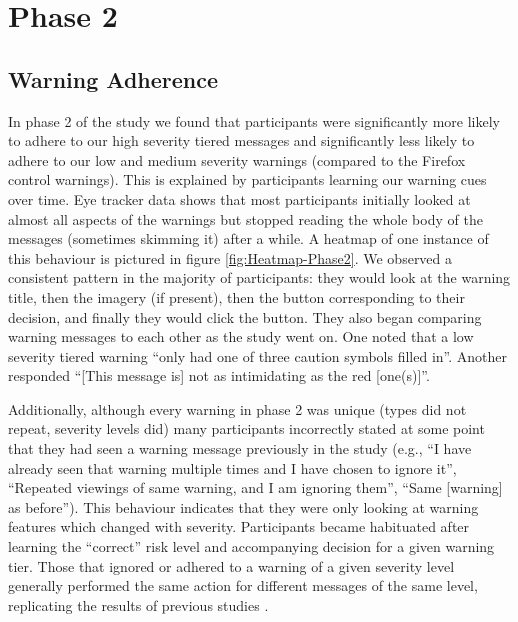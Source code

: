 \section{Phase 2}

\subsection{Warning Adherence}
In phase 2 of the study we found that participants were significantly more likely to adhere to our high severity tiered messages and significantly less likely to adhere to our low and medium severity warnings (compared to the Firefox control warnings). This is explained by participants learning our warning cues over time. Eye tracker data shows that most participants initially looked at almost all aspects of the warnings but stopped reading the whole body of the messages (sometimes skimming it) after a while. A heatmap of one instance of this behaviour is pictured in figure \ref{fig:Heatmap-Phase2}. We observed a consistent pattern in the majority of participants: they would look at the warning title, then the imagery (if present), then the button corresponding to their decision, and finally they would click the button. They also began comparing warning messages to each other as the study went on. One noted that a low severity tiered warning ``only had one of three caution symbols filled in''. Another responded ``[This message is] not as intimidating as the red [one(s)]''.

Additionally, although every warning in phase 2 was unique (types did not repeat, severity levels did) many participants incorrectly stated at some point that they had seen a warning message previously in the study (e.g., ``I have already seen that warning multiple times and I have chosen to ignore it'', ``Repeated viewings of same warning, and I am ignoring them'', ``Same [warning] as before''). This behaviour indicates that they were only looking at warning features which changed with severity. Participants became habituated after learning the ``correct'' risk level and accompanying decision for a given warning tier. Those that ignored or adhered to a warning of a given severity level generally performed the same action for different messages of the same level, replicating the results of previous studies \cite{felt2015improving, sunshine2009crying}. 

